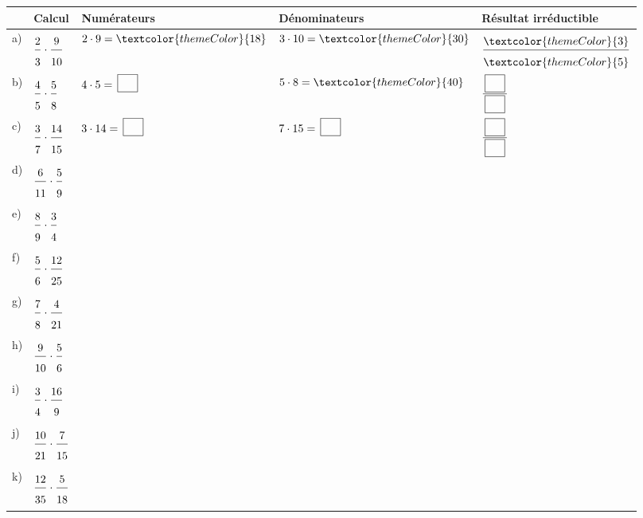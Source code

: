 \def\arraystretch{3}
\begin{tabularx}{\linewidth}{|>{\centering\arraybackslash}p{0.8cm}|>{\centering\arraybackslash}X|>{\centering\arraybackslash}X|>{\centering\arraybackslash}X|>{\centering\arraybackslash}X|}
\hline
\cellcolor{themeNO!30} & \cellcolor{themeNO!30}\textbf{Calcul} & \cellcolor{themeNO!30}\textbf{Numérateurs} & \cellcolor{themeNO!30}\textbf{Dénominateurs} & \cellcolor{themeNO!30}\textbf{Résultat irréductible} \\\hline
a) & $\FA{2}{3}\cdot\FA{9}{10}$ & $2 \cdot 9 = \textcolor{themeColor}{18}$ & $3 \cdot 10 = \textcolor{themeColor}{30}$ & $\FA{\textcolor{themeColor}{3}}{\textcolor{themeColor}{5}}$ \\\hline
b) & $\FA{4}{5}\cdot\FA{5}{8}$ & $4 \cdot 5 = \CaseC$ & $5 \cdot 8 = \textcolor{themeColor}{40}$ & $\FA{\CaseC}{\CaseC}$ \\\hline
c) & $\FA{3}{7}\cdot\FA{14}{15}$ & $3 \cdot 14 = \CaseC$ & $7 \cdot 15 = \CaseC$ & $\FA{\CaseC}{\CaseC}$ \\\hline
d) & $\FA{6}{11}\cdot\FA{5}{9}$ &  &  &  \\\hline
e) & $\FA{8}{9}\cdot\FA{3}{4}$ &  &  &  \\\hline
f) & $\FA{5}{6}\cdot\FA{12}{25}$ &  &  &  \\\hline
g) & $\FA{7}{8}\cdot\FA{4}{21}$ &  &  &  \\\hline
h) & $\FA{9}{10}\cdot\FA{5}{6}$ &  &  &  \\\hline
i) & $\FA{3}{4}\cdot\FA{16}{9}$ &  &  &  \\\hline
j) & $\FA{10}{21}\cdot\FA{7}{15}$ &  &  &  \\\hline
k) & $\FA{12}{35}\cdot\FA{5}{18}$ &  &  &  \\\hline
\end{tabularx}
\def\arraystretch{1}
 
\newpage
{}
 

